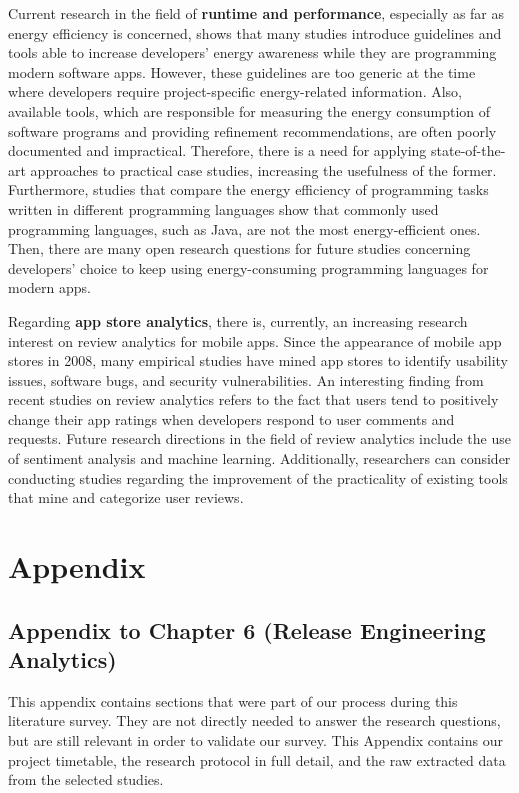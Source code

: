 \documentclass[]{book}
\begin{document}
Current research in the field of \textbf{runtime and performance},
especially as far as energy efficiency is concerned, shows that many
studies introduce guidelines and tools able to increase developers'
energy awareness while they are programming modern software apps.
However, these guidelines are too generic at the time where developers
require project-specific energy-related information. Also, available
tools, which are responsible for measuring the energy consumption of
software programs and providing refinement recommendations, are often
poorly documented and impractical. Therefore, there is a need for
applying state-of-the-art approaches to practical case studies,
increasing the usefulness of the former. Furthermore, studies that
compare the energy efficiency of programming tasks written in different
programming languages show that commonly used programming languages,
such as Java, are not the most energy-efficient ones. Then, there are
many open research questions for future studies concerning developers'
choice to keep using energy-consuming programming languages for modern
apps.

Regarding \textbf{app store analytics}, there is, currently, an
increasing research interest on review analytics for mobile apps. Since
the appearance of mobile app stores in 2008, many empirical studies have
mined app stores to identify usability issues, software bugs, and
security vulnerabilities. An interesting finding from recent studies on
review analytics refers to the fact that users tend to positively change
their app ratings when developers respond to user comments and requests.
Future research directions in the field of review analytics include the
use of sentiment analysis and machine learning. Additionally,
researchers can consider conducting studies regarding the improvement of
the practicality of existing tools that mine and categorize user
reviews.

\appendix


\chapter{Appendix}\label{appendix-1}

\section{Appendix to Chapter 6 (Release Engineering
Analytics)}\label{appendix-to-chapter-6-release-engineering-analytics}

This appendix contains sections that were part of our process during
this literature survey. They are not directly needed to answer the
research questions, but are still relevant in order to validate our
survey. This Appendix contains our project timetable, the research
protocol in full detail, and the raw extracted data from the selected
studies.
\end{document}
